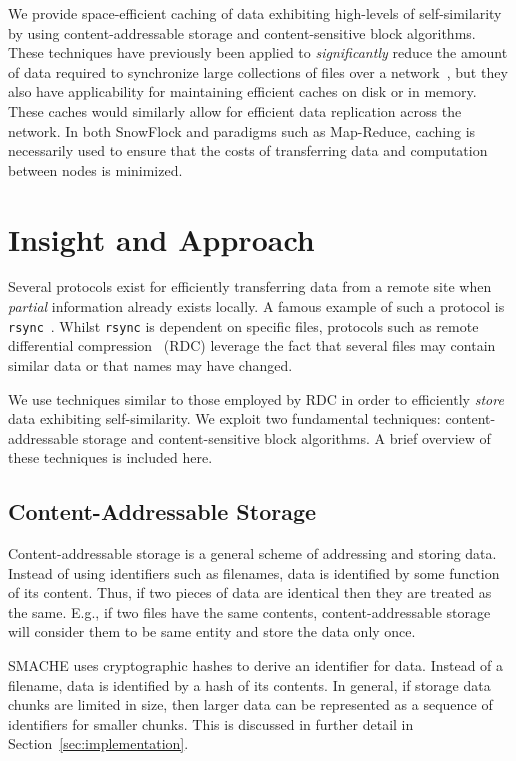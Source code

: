 \documentclass{sigplanconf}[11pt]
\begin{document}
We provide space-efficient caching of data exhibiting high-levels of
self-similarity by using content-addressable storage and content-sensitive
block algorithms.  These techniques have previously been applied to {\em
significantly} reduce the amount of data required to synchronize large
collections of files over a network~\cite{rdc,improvedfile}, but they also have
applicability for maintaining efficient caches on disk or in memory.  These
caches would similarly allow for efficient data replication across the network.
In both SnowFlock and paradigms such as Map-Reduce, caching is necessarily used
to ensure that the costs of transferring data and computation between nodes is
minimized.

\section{Insight and Approach}
\label{sec:insight}

Several protocols exist for efficiently transferring data from a remote site
when {\em partial} information already exists locally.  A famous example of
such a protocol is {\tt rsync}~\cite{rsync}.  Whilst {\tt rsync} is dependent
on specific files, protocols such as remote differential compression~\cite{rdc}
(RDC) leverage the fact that several files may contain similar data or that
names may have changed.

We use techniques similar to those employed by RDC in order to efficiently {\em
store} data exhibiting self-similarity.  We exploit two fundamental techniques:
content-addressable storage and content-sensitive block algorithms.  A brief
overview of these techniques is included here.

\subsection*{Content-Addressable Storage}

Content-addressable storage is a general scheme of addressing and storing data.
Instead of using identifiers such as filenames, data is identified by some
function of its content.  Thus, if two pieces of data are identical then they
are treated as the same.  E.g., if two files have the same contents,
content-addressable storage will consider them to be same entity and store the
data only once.

SMACHE uses cryptographic hashes to derive an identifier for data.  Instead of
a filename, data is identified by a hash of its contents.  In general, if
storage data chunks are limited in size, then larger data can be represented as
a sequence of identifiers for smaller chunks.  This is discussed in further
detail in Section~\ref{sec:implementation}.
\end{document}
